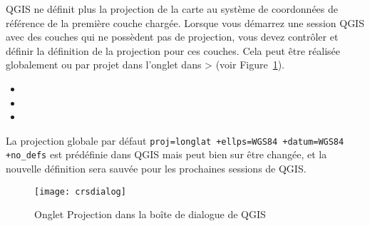 QGIS ne d\'efinit plus la projection de la carte au syst\`eme de
coordonn\'ees de r\'ef\'erence de la premi\`ere couche charg\'ee. Lorsque vous d\'emarrez
une session QGIS avec des couches qui ne poss\`edent pas de projection, vous devez
contr\^oler et d\'efinir la d\'efinition de la projection pour ces couches. Cela peut
\^etre r\'ealis\'ee globalement ou par projet dans l'onglet  dans 
 >  (voir
 Figure~\ref{fig:crsdialog}).

\begin{itemize}
\item {}
\item {}
\item {}
\end{itemize}

La projection globale par d\'efaut \texttt{proj=longlat +ellps=WGS84 +datum=WGS84
 +no\_defs} est pr\'ed\'efinie dans QGIS mais peut bien sur \^etre chang\'ee, et la
nouvelle d\'efinition sera sauv\'ee pour les prochaines sessions de QGIS.

\begin{figure}[ht]
   \begin{center}
   \caption{Onglet Projection dans la bo\^ite de dialogue de QGIS
\nixcaption}\label{fig:crsdialog}\smallskip
   \texttt{[image: crsdialog]}
\end{center}
\end{figure}

